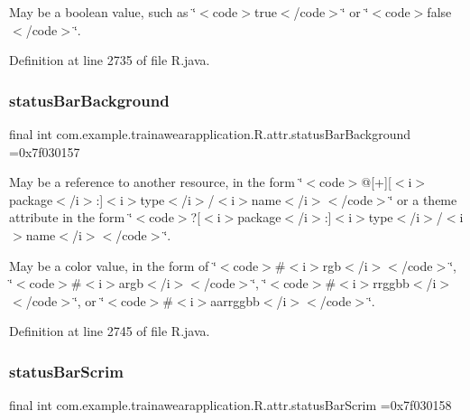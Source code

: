 May be a boolean value, such as \char`\"{}$<$code$>$true$<$/code$>$\char`\"{} or \char`\"{}$<$code$>$false$<$/code$>$\char`\"{}. 

Definition at line 2735 of file R.\+java.

\mbox{\label{classcom_1_1example_1_1trainawearapplication_1_1_r_1_1attr_a6dbc278ab5b00fe7fe4a0a17c0253026}} 
\subsubsection{\texorpdfstring{statusBarBackground}{statusBarBackground}}
{\footnotesize\ttfamily final int com.\+example.\+trainawearapplication.\+R.\+attr.\+status\+Bar\+Background =0x7f030157\hspace{0.3cm}{\ttfamily [static]}}

May be a reference to another resource, in the form \char`\"{}$<$code$>$@\mbox{[}+\mbox{]}\mbox{[}$<$i$>$package$<$/i$>$\+:\mbox{]}$<$i$>$type$<$/i$>$/$<$i$>$name$<$/i$>$$<$/code$>$\char`\"{} or a theme attribute in the form \char`\"{}$<$code$>$?\mbox{[}$<$i$>$package$<$/i$>$\+:\mbox{]}$<$i$>$type$<$/i$>$/$<$i$>$name$<$/i$>$$<$/code$>$\char`\"{}. 

May be a color value, in the form of \char`\"{}$<$code$>$\#$<$i$>$rgb$<$/i$>$$<$/code$>$\char`\"{}, \char`\"{}$<$code$>$\#$<$i$>$argb$<$/i$>$$<$/code$>$\char`\"{}, \char`\"{}$<$code$>$\#$<$i$>$rrggbb$<$/i$>$$<$/code$>$\char`\"{}, or \char`\"{}$<$code$>$\#$<$i$>$aarrggbb$<$/i$>$$<$/code$>$\char`\"{}. 

Definition at line 2745 of file R.\+java.

\mbox{\label{classcom_1_1example_1_1trainawearapplication_1_1_r_1_1attr_afbf9816fafd09b2a2987b42150919fb3}} 
\subsubsection{\texorpdfstring{statusBarScrim}{statusBarScrim}}
{\footnotesize\ttfamily final int com.\+example.\+trainawearapplication.\+R.\+attr.\+status\+Bar\+Scrim =0x7f030158\hspace{0.3cm}{\ttfamily [static]}}


